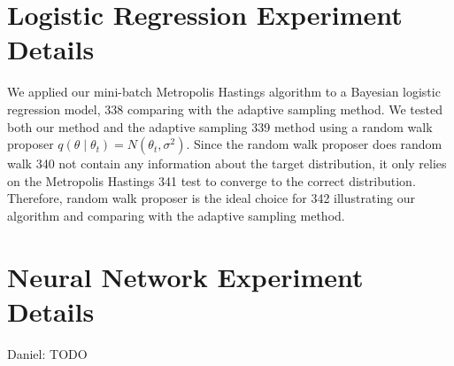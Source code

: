 \documentclass{article}
\begin{document}
\section{Logistic Regression Experiment Details}\label{app:logistic}

We applied our mini-batch Metropolis Hastings algorithm to a Bayesian logistic regression model,
338 comparing with the adaptive sampling method. We tested both our method and the adaptive sampling
339 method using a random walk proposer $q(\theta \mid \theta_t) = N (\theta_t, \sigma^2)$. Since the random walk proposer does random walk
340 not contain any information about the target distribution, it only relies on the Metropolis Hastings
341 test to converge to the correct distribution. Therefore, random walk proposer is the ideal choice for
342 illustrating our algorithm and comparing with the adaptive sampling method.
\section{Neural Network Experiment Details}\label{app:nnet}

{\color{blue}
Daniel: TODO
}

\end{document}
